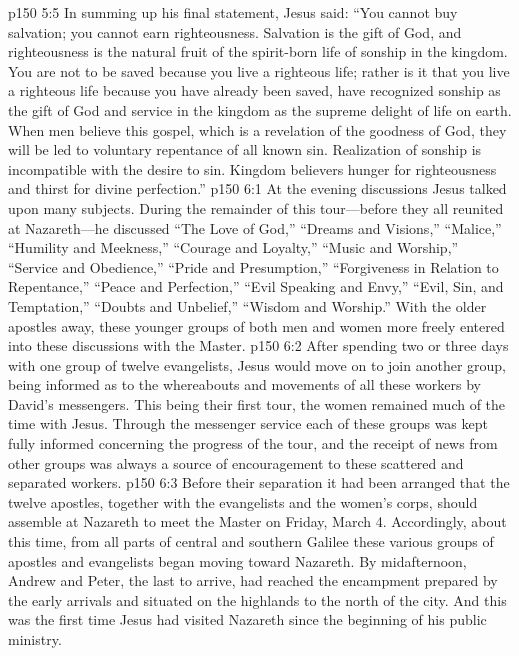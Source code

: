 \vs p150 5:5 In summing up his final statement, Jesus said: \textcolor{ubdarkred}{“You cannot buy salvation; you cannot earn righteousness. Salvation is the gift of God, and righteousness is the natural fruit of the spirit\hyp{}born life of sonship in the kingdom. You are not to be saved because you live a righteous life; rather is it that you live a righteous life because you have already been saved, have recognized sonship as the gift of God and service in the kingdom as the supreme delight of life on earth. When men believe this gospel, which is a revelation of the goodness of God, they will be led to voluntary repentance of all known sin. Realization of sonship is incompatible with the desire to sin. Kingdom believers hunger for righteousness and thirst for divine perfection.”}\plusone
{}
\vs p150 6:1 At the evening discussions Jesus talked upon many subjects. During the remainder of this tour---before they all reunited at Nazareth---he discussed \textcolor{ubdarkred}{“The Love of God,” “Dreams and Visions,” “Malice,” “Humility and Meekness,” “Courage and Loyalty,” “Music and Worship,” “Service and Obedience,” “Pride and Presumption,” “Forgiveness in Relation to Repentance,” “Peace and Perfection,” “Evil Speaking and Envy,” “Evil, Sin, and Temptation,” “Doubts and Unbelief,” “Wisdom and Worship.”} With the older apostles away, these younger groups of both men and women more freely entered into these discussions with the Master.
\vs p150 6:2 After spending two or three days with one group of twelve evangelists, Jesus would move on to join another group, being informed as to the whereabouts and movements of all these workers by David’s messengers. This being their first tour, the women remained much of the time with Jesus. Through the messenger service each of these groups was kept fully informed concerning the progress of the tour, and the receipt of news from other groups was always a source of encouragement to these scattered and separated workers.
\vs p150 6:3 Before their separation it had been arranged that the twelve apostles, together with the evangelists and the women’s corps, should assemble at Nazareth to meet the Master on Friday, March 4. Accordingly, about this time, from all parts of central and southern Galilee these various groups of apostles and evangelists began moving toward Nazareth. By midafternoon, Andrew and Peter, the last to arrive, had reached the encampment prepared by the early arrivals and situated on the highlands to the north of the city. And this was the first time Jesus had visited Nazareth since the beginning of his public ministry.
